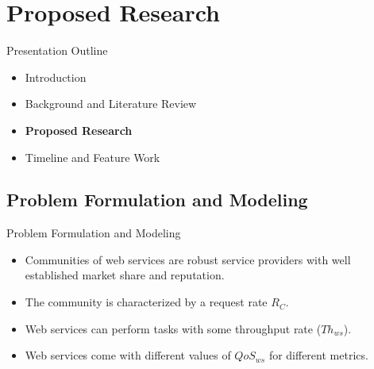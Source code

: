 \documentclass{beamer}
\begin{document}


\section{Proposed Research}
\begin{frame}{Presentation Outline}
    \begin{itemize}
     	\itemsep=.5cm
    	\item Introduction
    	\item Background and Literature Review
    	\item {\bf Proposed Research}
    	\item Timeline and Feature Work
    \end{itemize}
\end{frame}

\subsection{Problem Formulation and Modeling}

\begin{frame}{Problem Formulation and Modeling}
    \begin{itemize}
        \item Communities of web services are robust service providers with well established market share and reputation.
        \item The community is characterized by a request rate $R_C$.
        \item Web services can perform tasks with some throughput rate ($Th_{ws}$).
        \item Web services come with different values of $QoS_{ws}$ for different metrics.
    \end{itemize}
\end{frame}
\end{document}
